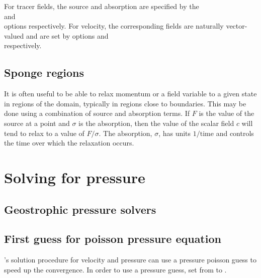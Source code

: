 For tracer fields, the source and absorption are specified by the\onlypdf\\
 and\onlypdf\\
 options
respectively. For velocity, the corresponding fields are naturally
vector-valued and are set by options\onlypdf\linebreak
{} and\onlypdf\\
respectively.

\subsection{Sponge regions}\label{sec:Sponge}
It is often useful to be able to relax momentum or a field variable to a
given state in regions of the domain, typically in regions close to
boundaries. This may be done using a combination of source and absorption
terms. If $F$ is the value of the source at a point and $\sigma$ is the
absorption, then the value of the scalar field $c$ will tend to relax to a value
of $F/\sigma$. The absorption, $\sigma$, has units $1/\mathrm{time}$ and controls the
time over which the relaxation occurs.

\section{Solving for pressure}
\label{sec:configuring_fluidity_pressure}

\subsection{Geostrophic pressure solvers}
\label{sec:config_geostrophic_balance}

\subsection{First guess for poisson pressure equation} \label{sec:poisson_pressure_solution}
\fluidity's solution procedure for velocity and pressure can use a pressure poisson guess to speed up the convergence. In order to use a pressure guess, set  from  to .



